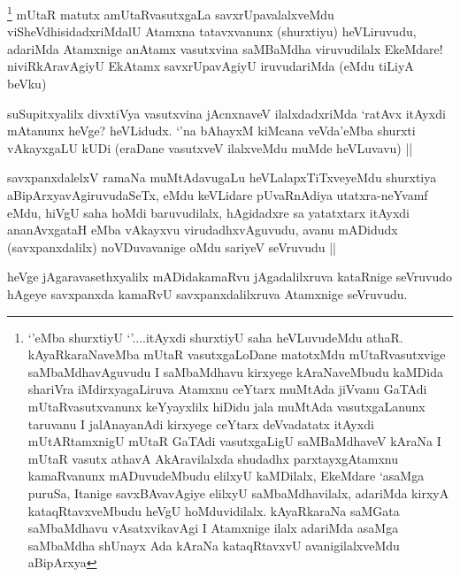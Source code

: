 \begin{artha}
\footnote{`\stext'eMba shurxtiyU `\stext'....itAyxdi shurxtiyU saha heVLuvudeMdu athaR. kAyaRkaraNaveMba mUtaR vasutxgaLoDane matotxMdu mUtaRvasutxvige saMbaMdhavAguvudu I saMbaMdhavu kirxyege kAraNaveMbudu kaMDida shariVra iMdirxyagaLiruva Atamxnu ceYtarx muMtAda jiVvanu GaTAdi mUtaRvasutxvanunx keYyayxlilx hiDidu jala muMtAda vasutxgaLanunx taruvanu I jalAnayanAdi kirxyege ceYtarx deVvadatatx itAyxdi mUtARtamxnigU mUtaR GaTAdi vasutxgaLigU saMBaMdhaveV kAraNa I mUtaR vasutx athavA AkAravilalxda shudadhx parxtayxgAtamxnu kamaRvanunx mADuvudeMbudu elilxyU kaMDilalx, EkeMdare `asaMga puruSa, Itanige savxBAvavAgiye elilxyU saMbaMdhavilalx, adariMda kirxyA kataqRtavxveMbudu heVgU hoMduvidilalx. kAyaRkaraNa saMGata saMbaMdhavu vAsatxvikavAgi I Atamxnige ilalx adariMda asaMga saMbaMdha shUnayx Ada kAraNa kataqRtavxvU avanigilalxveMdu aBipArxya}
mUtaR matutx amUtaRvasutxgaLa savxrUpavalalxveMdu viSheVdhisidadxriMdalU Atamxna tatavxvanunx (shurxtiyu) heVLiruvudu, adariMda Atamxnige anAtamx vasutxvina saMBaMdha viruvudilalx EkeMdare! niviRkAravAgiyU EkAtamx savxrUpavAgiyU iruvudariMda (eMdu tiLiyA beVku)
\end{artha}


\begin{artha}
suSupitxyalilx divxtiVya vasutxvina jAcnxnaveV ilalxdadxriMda `ratAvx itAyxdi mAtanunx heVge? heVLidudx. `\stext'na bAhayxM kiMcana veVda'eMba shurxti vAkayxgaLU kUDi (eraDane vasutxveV ilalxveMdu muMde heVLuvavu) ||
\end{artha}


\begin{artha}
  savxpanxdalelxV ramaNa muMtAdavugaLu heVLalapxTiTxveyeMdu shurxtiya aBipArxyavAgiruvudaSeTx, eMdu keVLidare pUvaRnAdiya utatxra-neYvamf eMdu, hiVgU saha hoMdi baruvudilalx, hAgidadxre sa yatatxtarx itAyxdi ananAvxgataH eMba vAkayxvu virudadhxvAguvudu, avanu mADidudx (savxpanxdalilx) noVDuvavanige oMdu sariyeV seVruvudu ||                                       
\end{artha}


\begin{artha}
heVge jAgaravasethxyalilx mADidakamaRvu jAgadalilxruva kataRnige seVruvudo hAgeye savxpanxda kamaRvU savxpanxdalilxruva Atamxnige seVruvudu.
\end{artha}

